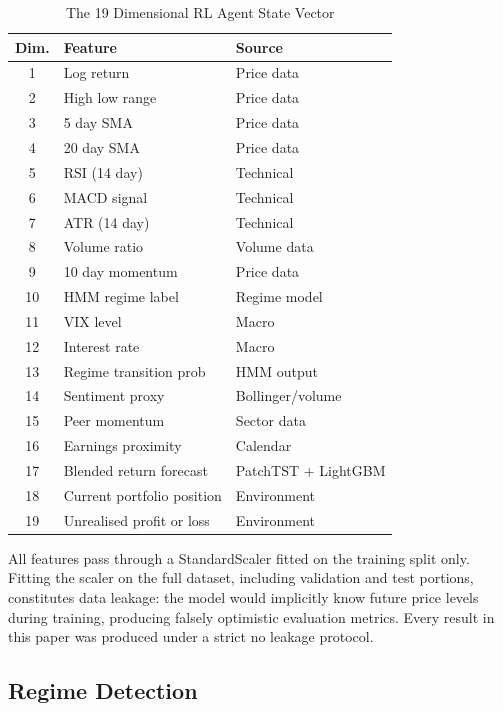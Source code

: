 \documentclass[journal]{IEEEtran}
\begin{document}
\begin{table}[!t]
\renewcommand{\arraystretch}{1.3}
\caption{The 19 Dimensional RL Agent State Vector}
\label{tab:state_vector}
\centering
\begin{tabular}{|c|l|l|}
\hline
\textbf{Dim.} & \textbf{Feature} & \textbf{Source} \\
\hline
1  & Log return             & Price data \\
2  & High low range         & Price data \\
3  & 5 day SMA              & Price data \\
4  & 20 day SMA             & Price data \\
5  & RSI (14 day)           & Technical \\
6  & MACD signal            & Technical \\
7  & ATR (14 day)           & Technical \\
8  & Volume ratio           & Volume data \\
9  & 10 day momentum        & Price data \\
10 & HMM regime label       & Regime model \\
11 & VIX level              & Macro \\
12 & Interest rate          & Macro \\
13 & Regime transition prob & HMM output \\
14 & Sentiment proxy        & Bollinger/volume \\
15 & Peer momentum          & Sector data \\
16 & Earnings proximity     & Calendar \\
17 & Blended return forecast & PatchTST + LightGBM \\
18 & Current portfolio position & Environment \\
19 & Unrealised profit or loss  & Environment \\
\hline
\end{tabular}
\end{table}

All features pass through a StandardScaler fitted on the training split
only. Fitting the scaler on the full dataset, including validation and
test portions, constitutes data leakage: the model would implicitly know
future price levels during training, producing falsely optimistic
evaluation metrics. Every result in this paper was produced under a strict
no leakage protocol.

\subsection{Regime Detection}
\end{document}
